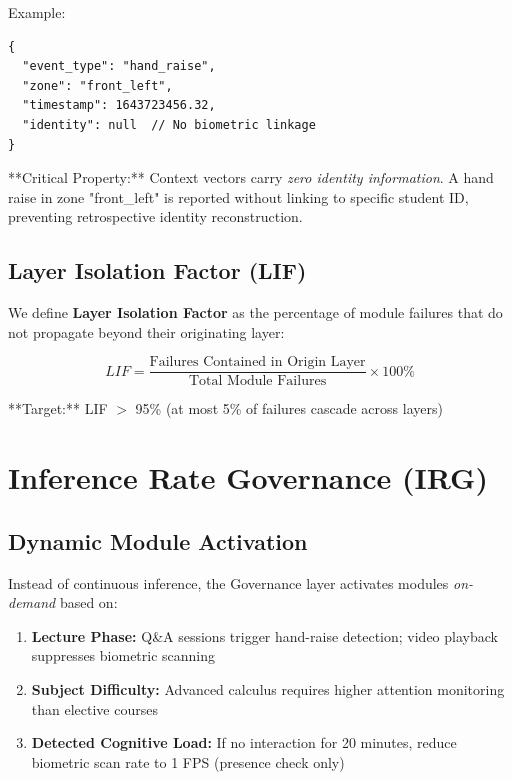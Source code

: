 \documentclass[conference]{IEEEtran}
\begin{document}
Example:
\begin{verbatim}
{
  "event_type": "hand_raise",
  "zone": "front_left",
  "timestamp": 1643723456.32,
  "identity": null  // No biometric linkage
}
\end{verbatim}

**Critical Property:** Context vectors carry \textit{zero identity information}. A hand raise in zone "front\_left" is reported without linking to specific student ID, preventing retrospective identity reconstruction.

\subsection{Layer Isolation Factor (LIF)}
We define \textbf{Layer Isolation Factor} as the percentage of module failures that do not propagate beyond their originating layer:

\begin{equation}
LIF = \frac{\text{Failures Contained in Origin Layer}}{\text{Total Module Failures}} \times 100\%
\end{equation}

**Target:** LIF $>$ 95\% (at most 5\% of failures cascade across layers)

\section{Inference Rate Governance (IRG)}

\subsection{Dynamic Module Activation}
Instead of continuous inference, the Governance layer activates modules \textit{on-demand} based on:
\begin{enumerate}
    \item \textbf{Lecture Phase:} Q\&A sessions trigger hand-raise detection; video playback suppresses biometric scanning
    \item \textbf{Subject Difficulty:} Advanced calculus requires higher attention monitoring than elective courses
    \item \textbf{Detected Cognitive Load:} If no interaction for 20 minutes, reduce biometric scan rate to 1 FPS (presence check only)
\end{enumerate}
\end{document}
